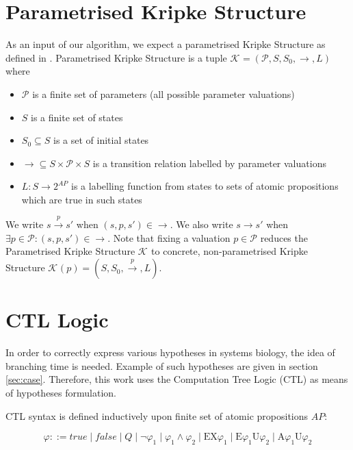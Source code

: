 \documentclass[12pt,oneside]{fithesis2}
\newcommand{\ks}[1][]{\ensuremath{\mathcal{K}_{#1}}}
\newcommand{\fullKs}{\ensuremath{ \ks = (\params, S, S_0, \trans{}, L) }}
\newcommand{\trans}[1]{\stackrel{#1}{\rightarrow}}
\newcommand{\params}{\mathcal{P}}
\newcommand{\eu}[2]{\ensuremath{\mbox{E} #1 \mbox{U} #2 }}
\newcommand{\au}[2]{\ensuremath{\mbox{A} #1 \mbox{U} #2 }}
\newcommand{\ex}[1]{\ensuremath{\mbox{EX} #1}}
\begin{document}
		\section{Parametrised Kripke Structure}
	
			As an input of our algorithm, we expect a parametrised Kripke Structure as defined in \cite{ieee}. Parametrised Kripke Structure is a tuple $\fullKs$ where
			
			\begin{itemize}
				\item $\params$ is a finite set of parameters (all possible parameter valuations)
				\item $S$ is a finite set of states
				\item $S_0 \subseteq S$ is a set of initial states
				\item $\trans{} \subseteq S \times \params \times S$ is a transition relation labelled by parameter valuations 
				\item $L: S \rightarrow 2^{AP} $ is a labelling function from states to sets of atomic propositions which are true in such states
			\end{itemize} 		
			
			We write $ s \trans{p} s' $ when $ (s, p, s') \in \trans{} $. We also write $ s \trans{} s'$ when $\exists p \in \params : (s, p, s') \in \trans{} $. Note that fixing a valuation $p \in \params$ reduces the Parametrised Kripke Structure $\ks$ to concrete, non-parametrised Kripke Structure $\ks(p) = (S, S_0, \trans{p}, L)$.
						
		\section{CTL Logic}
		
			In order to correctly express various hypotheses in systems biology, the idea of branching time is needed. Example of such hypotheses are given in section \ref{sec:case}. Therefore, this work uses the Computation Tree Logic (CTL) as means of hypotheses formulation. 

			CTL syntax is defined inductively upon finite set of atomic propositions $AP$:
			
			\begin{equation}
				\varphi ::= 
					true \mid
					false \mid
					Q \mid 
					\neg \varphi_1 \mid 
					\varphi_1 \wedge \varphi_2 \mid
					\ex{\varphi_1} \mid
					\eu{\varphi_1}{\varphi_2} \mid
					\au{\varphi_1}{\varphi_2}			
			\end{equation}
			
\end{document}
